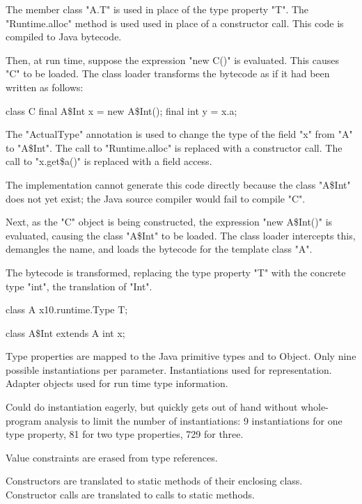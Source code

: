 The member class \xcd"A.T" is used in place of the
type property \xcd"T". 
The \xcd"Runtime.alloc" method is used
used in place of a constructor call.
This code is compiled to Java bytecode.


Then, at run time, suppose the expression \xcd"new C()" is
evaluated.  This causes \xcd"C" to be loaded.
The class loader transforms the bytecode as if it had
been written as follows:

{\footnotesize
\begin{xten}
class C {
    final A\$Int x = new A\$Int();
    final int y = x.a;
}
\end{xten}}

The \xcd"ActualType" annotation is used to change the
type of the field \xcd"x" from \xcd"A" to \xcd"A\$Int".
The call to \xcd"Runtime.alloc" is replaced with a
constructor call.  The call to \xcd"x.get\$a()" is
replaced with a field access.

The implementation cannot generate this code directly because
the class \xcd"A\$Int" does not yet exist; the Java source compiler
would fail to compile \xcd"C".

Next, as the \xcd"C" object is being constructed, the expression
\xcd"new A\$Int()" is evaluated, causing the class \xcd"A\$Int" to
be loaded.  The class loader intercepts
this, demangles the name, and loads the bytecode for the
template class \xcd"A".

The bytecode is transformed, replacing the type property \xcd"T"
with the concrete type \xcd"int", the translation of \xcd"Int".



{\footnotesize
\begin{xten}
class A {
    x10.runtime.Type T;
}

class A\$Int extends A {
    int x;
}
\end{xten}}

Type properties are mapped to the Java primitive types and to
Object.  Only nine possible instantiations per parameter.
Instantiations used for representation.
Adapter objects used for run time type information.

Could do instantiation eagerly, but quickly gets out of hand without
whole-program analysis to limit the number of instantiations: 9
instantiations for one type property, 81 for two type
properties, 729 for three.

Value constraints are erased from type references.

Constructors are translated to static methods of their enclosing
class.
Constructor calls
are translated to calls to static methods.


